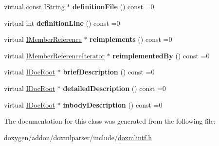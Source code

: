 \begin{DoxyCompactItemize}
\mbox{\label{class_i_member_acad5ba680a11d1e75cc90bed2b05b66e}} 
virtual const \mbox{\hyperlink{class_i_string}{I\+String}} $\ast$ {\bfseries definition\+File} () const =0
\item 
\mbox{\label{class_i_member_a69b4100409d9125c9af0569e058b5ca6}} 
virtual int {\bfseries definition\+Line} () const =0
\item 
\mbox{\label{class_i_member_a0469cb74868ede0532560cf11ea8b462}} 
virtual \mbox{\hyperlink{class_i_member_reference}{I\+Member\+Reference}} $\ast$ {\bfseries reimplements} () const =0
\item 
\mbox{\label{class_i_member_ab98947cc5e497846cd3f2e610baffff8}} 
virtual \mbox{\hyperlink{class_i_member_reference_iterator}{I\+Member\+Reference\+Iterator}} $\ast$ {\bfseries reimplemented\+By} () const =0
\item 
\mbox{\label{class_i_member_a51e22cf0dbb09bddb5a31e652cc297b3}} 
virtual \mbox{\hyperlink{class_i_doc_root}{I\+Doc\+Root}} $\ast$ {\bfseries brief\+Description} () const =0
\item 
\mbox{\label{class_i_member_a063a767b3e70c03760dbe6dc254b6c38}} 
virtual \mbox{\hyperlink{class_i_doc_root}{I\+Doc\+Root}} $\ast$ {\bfseries detailed\+Description} () const =0
\item 
\mbox{\label{class_i_member_a842140442b5379fe61b793a9cbef1b0e}} 
virtual \mbox{\hyperlink{class_i_doc_root}{I\+Doc\+Root}} $\ast$ {\bfseries inbody\+Description} () const =0
\end{DoxyCompactItemize}


The documentation for this class was generated from the following file\+:\begin{DoxyCompactItemize}
\item 
doxygen/addon/doxmlparser/include/\mbox{\hyperlink{include_2doxmlintf_8h}{doxmlintf.\+h}}\end{DoxyCompactItemize}
